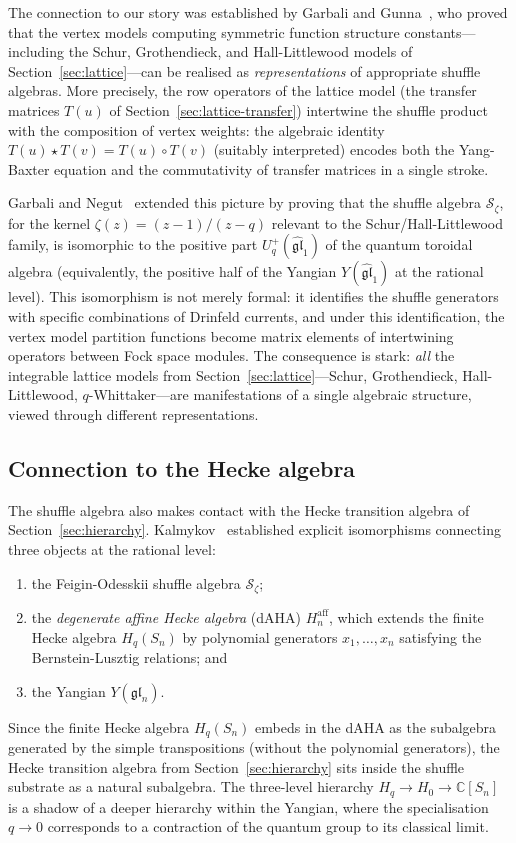 The connection to our story was established by Garbali and
Gunna~\cite{garbali-gunna-2024}, who proved that the vertex models
computing symmetric function structure constants---including the
Schur, Grothendieck, and Hall-Littlewood models of
Section~\ref{sec:lattice}---can be realised as \emph{representations}
of appropriate shuffle algebras.  More precisely, the row operators of
the lattice model (the transfer matrices $T(u)$ of
Section~\ref{sec:lattice-transfer}) intertwine the shuffle product
with the composition of vertex weights: the algebraic identity
$T(u) \star T(v) = T(u) \circ T(v)$ (suitably interpreted) encodes
both the Yang-Baxter equation and the commutativity of transfer
matrices in a single stroke.

Garbali and Negut~\cite{garbali-negut-2025} extended this picture by
proving that the shuffle algebra $\mathcal{S}_\zeta$, for the kernel
$\zeta(z) = (z - 1)/(z - q)$ relevant to the Schur/Hall-Littlewood
family, is isomorphic to the positive part $U_q^+(\widehat{\mathfrak{gl}}_1)$
of the quantum toroidal algebra (equivalently, the positive half of
the Yangian $Y(\widehat{\mathfrak{gl}}_1)$ at the rational level).
This isomorphism is not merely formal: it identifies the shuffle
generators with specific combinations of Drinfeld currents, and under
this identification, the vertex model partition functions become
matrix elements of intertwining operators between Fock space modules.
The consequence is stark: \emph{all} the integrable lattice models
from Section~\ref{sec:lattice}---Schur, Grothendieck,
Hall-Littlewood, $q$-Whittaker---are manifestations of a single
algebraic structure, viewed through different representations.

\subsection{Connection to the Hecke algebra}

The shuffle algebra also makes contact with the Hecke transition
algebra of Section~\ref{sec:hierarchy}.  Kalmykov~\cite{kalmykov}
established explicit isomorphisms connecting three objects at the
rational level:
\begin{enumerate}
\item the Feigin-Odesskii shuffle algebra $\mathcal{S}_\zeta$;
\item the \emph{degenerate affine Hecke algebra} (dAHA)
  $H_n^{\mathrm{aff}}$, which extends the finite Hecke algebra $H_q(S_n)$
  by polynomial generators $x_1, \ldots, x_n$ satisfying the
  Bernstein-Lusztig relations; and
\item the Yangian $Y(\mathfrak{gl}_n)$.
\end{enumerate}
Since the finite Hecke algebra $H_q(S_n)$ embeds in the dAHA as the
subalgebra generated by the simple transpositions (without the
polynomial generators), the Hecke transition algebra from
Section~\ref{sec:hierarchy} sits inside the shuffle substrate as a
natural subalgebra.  The three-level hierarchy
$H_q \to H_0 \to \mathbb{C}[S_n]$ is a shadow of a deeper hierarchy
within the Yangian, where the specialisation $q \to 0$ corresponds to
a contraction of the quantum group to its classical limit.

